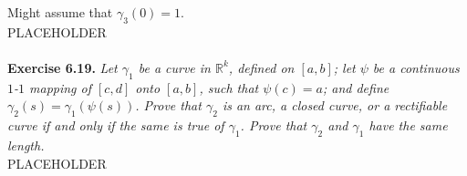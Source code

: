 \documentclass{article}
\begin{document}
Might assume that $\gamma_3(0) = 1$. \\

PLACEHOLDER \\\\






\textbf{Exercise 6.19.}
\emph{Let $\gamma_1$ be a curve in $\mathbb{R}^k$, defined on $[a,b]$;
let $\psi$ be a continuous $1$-$1$ mapping of $[c,d]$ onto $[a,b]$, such that
$\psi(c) = a$; and define $\gamma_2(s) = \gamma_1(\psi(s))$.
Prove that $\gamma_2$ is an arc, a closed curve, or a rectifiable curve
if and only if the same is true of $\gamma_1$.
Prove that $\gamma_2$ and $\gamma_1$ have the same length.} \\

PLACEHOLDER \\\\



\end{document}
